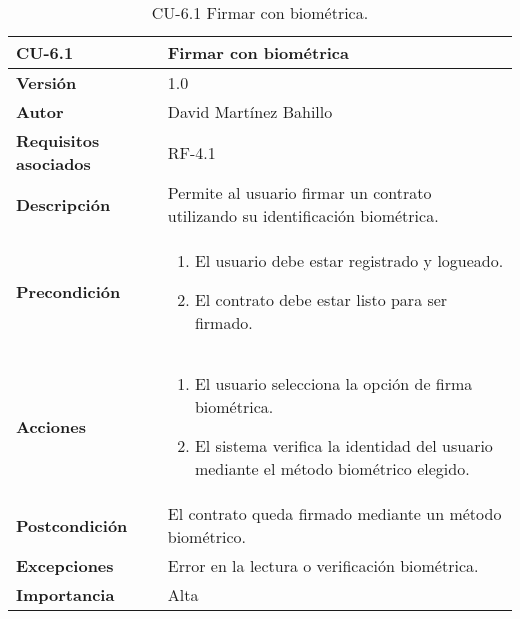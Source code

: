 \begin{table}[p]
	\centering
	\begin{tabularx}{\linewidth}{ p{} p{} }
		\toprule
		\textbf{CU-6.1}  & \textbf{Firmar con biométrica}\\
		\midrule
		\textbf{Versión}              & 1.0    \\
		\textbf{Autor}                & David Martínez Bahillo \\
		\textbf{Requisitos asociados} & RF-4.1 \\
		\textbf{Descripción}          & Permite al usuario firmar un contrato utilizando su identificación biométrica. \\
		\textbf{Precondición}         &  
		\begin{enumerate}
			\def\labelenumi{\arabic{enumi}.}
			\tightlist
			\item El usuario debe estar registrado y logueado.
			\item El contrato debe estar listo para ser firmado.
		\end{enumerate}\\
		\textbf{Acciones}             &
		\begin{enumerate}
			\def\labelenumi{\arabic{enumi}.}
			\tightlist
			\item El usuario selecciona la opción de firma biométrica.
			\item El sistema verifica la identidad del usuario mediante el método biométrico elegido.
		\end{enumerate}\\
		\textbf{Postcondición}        & El contrato queda firmado mediante un método biométrico. \\
		\textbf{Excepciones}          & Error en la lectura o verificación biométrica. \\
		\textbf{Importancia}          & Alta  \\
		\bottomrule
	\end{tabularx}
	\caption{CU-6.1 Firmar con biométrica.}
\end{table}


